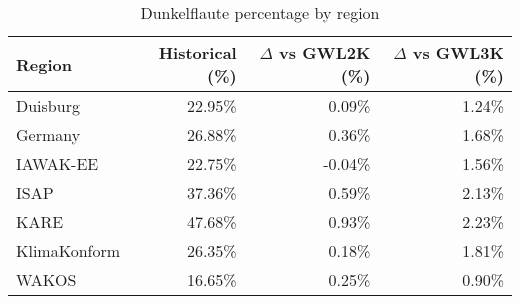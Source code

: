 \begin{table}[!htbp]
\centering
\caption{Dunkelflaute percentage by region}
\label{Table:Dunkelflaute_regions}
\begin{tabular}{lrrr}
\hline
Region & Historical (\%) & $\Delta$ vs GWL2K (\%) & $\Delta$ vs GWL3K (\%) \\
\hline
Duisburg & 22.95\% & 0.09\% & 1.24\%\\

Germany & 26.88\% & 0.36\% & 1.68\%\\

IAWAK-EE & 22.75\% & -0.04\% & 1.56\%\\

ISAP & 37.36\% & 0.59\% & 2.13\%\\

KARE & 47.68\% & 0.93\% & 2.23\%\\

KlimaKonform & 26.35\% & 0.18\% & 1.81\%\\

WAKOS & 16.65\% & 0.25\% & 0.90\%\\

\bottomrule
\end{tabular}
\end{table}
